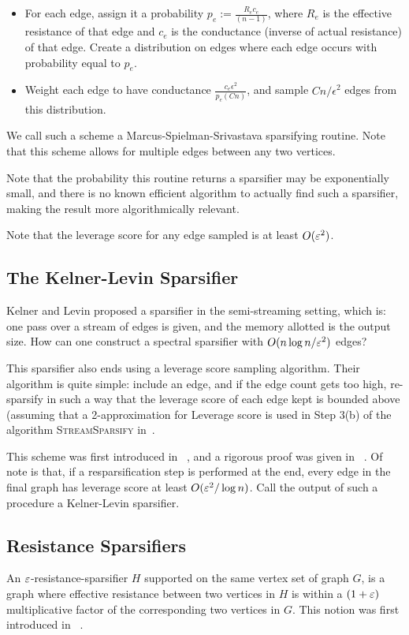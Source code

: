 \begin{itemize}
\item For each edge, assign it a probability $p_e := \frac{R_ec_e}{(n-1)}$, where $R_e$ is the effective resistance of that edge and $c_e$ is the conductance (inverse of actual resistance) of that edge. Create a distribution on edges where each edge occurs with probability equal to $p_e$.
\item Weight each edge to have conductance $\frac{c_e\epsilon^2}{p_e(Cn)}$, and sample $C n/\epsilon^2$ edges from this distribution.
\end{itemize}

We call such a scheme a Marcus-Spielman-Srivastava sparsifying routine. Note that this scheme allows for multiple edges between any two vertices. 

Note that the probability this routine returns a sparsifier may be exponentially small, and there is no known efficient algorithm to actually find such a sparsifier, making the \cite{SpielmanS08} result more algorithmically relevant.

Note that the leverage score for any edge sampled is at least
$O(\varepsilon^2)$.
\subsection{The Kelner-Levin Sparsifier} \label{sec:kl}
Kelner and Levin proposed a sparsifier in the semi-streaming setting,
       which is: one pass over a stream of edges is given, and the
       memory allotted is the output size. How can one construct a
       spectral sparsifier with $O(n \log n / \varepsilon^2)$ edges?

This sparsifier also ends using a leverage score sampling algorithm.
Their algorithm is quite simple: include an edge, and if the edge count
gets too high, re-sparsify in such a way that the leverage score of each
edge kept is bounded above (assuming that a 2-approximation for Leverage
    score is used in Step 3(b) of the algorithm
    \textsc{StreamSparsify}
    in~\cite{KyngPPS16}.

This scheme was first introduced in ~\cite{KelnerL13}, and a rigorous
proof was given in ~\cite{Pachocki16, KyngPPS16}.  Of note is that, if a
resparsification step is performed at the end, every edge in the final
graph has leverage score at least $O(\varepsilon^2 / \log n )$. Call the output
of such a procedure a Kelner-Levin sparsifier.

\subsection{Resistance Sparsifiers} \label{sec:res-sparse}
An $\varepsilon$-resistance-sparsifier $H$ supported on the same vertex set of
  graph $G$, is a graph where
  effective resistance between two vertices in $H$ is within a $(1+\varepsilon)$ multiplicative
  factor of the corresponding two vertices in $G$. This notion was first
  introduced in ~\cite{DinitzKW15}.

